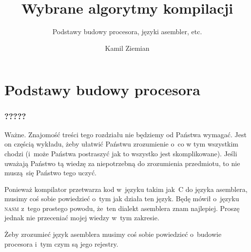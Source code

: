 \documentclass[10pt,t]{beamer}
\title{Wybrane algorytmy kompilacji}
\subtitle{Podstawy budowy procesora, języki asembler, etc.}
\author{Kamil Ziemian \\
  \email}
\begin{document}





\RaggedRight





\maketitle


















\section{Podstawy budowy procesora}





\begin{frame}
  \frametitle{?????}


  \alert{Ważne.} Znajomość treści tego rozdziału nie będziemy od Państwa
  wymagać. Jest on częścią wykładu, żeby ułatwić Państwu zrozumienie o~co w
  tym wszystkim chodzi (i~może Państwa postraszyć jak to wszystko jest
  skomplikowane). Jeśli uważają Państwo tą wiedzę za niepotrzebną do
  zrozumienia przedmiotu, to nie muszą~się Państwo tego uczyć.

  Ponieważ kompilator przetwarza kod w~języku takim jak~C do języka
  asemblera, musimy coś sobie powiedzieć o~tym jak działa ten język. Będę
  mówił o~języku \textsc{nasm} z~tego prostego powodu, że~ten dialekt
  asemblera znam najlepiej. Proszę jednak nie przeceniać mojej wiedzy w~tym
  zakresie.

  Żeby zrozumieć język asemblera musimy coś sobie powiedzieć o~budowie
  procesora i~tym czym są jego rejestry.

\end{frame}
\end{document}
